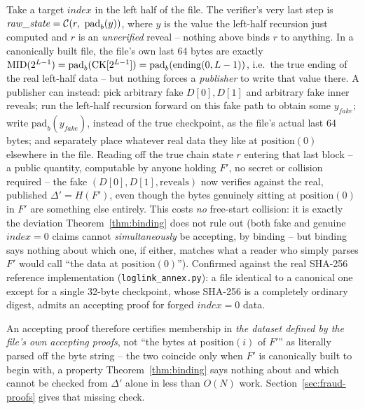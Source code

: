 \begin{remark}
\label{rem:layout-forgery}
Take a target $\mathit{index}$ in the left half of the file. The verifier's
very last step is $\mathit{raw\_state} = \C(r,\ \mathrm{pad}_b(y))$, where
$y$ is the value the left-half recursion just computed and $r$ is an
\emph{unverified} reveal -- nothing above binds $r$ to anything. In a
canonically built file, the file's own last 64 bytes are exactly
$\mathrm{MID}(2^{L-1}) = \mathrm{pad}_b(\mathrm{CK}[2^{L-1}]) = \mathrm{pad}_b(\mathrm{ending}(0,L-1))$,
i.e.\ the true ending of the real left-half data -- but nothing forces a
\emph{publisher} to write that value there. A publisher can instead:
pick arbitrary fake $D[0], D[1]$ and arbitrary fake inner reveals; run the
left-half recursion forward on this fake path to obtain some $y_{\mathit{fake}}$;
write $\mathrm{pad}_b(y_{\mathit{fake}})$, instead of the true checkpoint, as
the file's actual last 64 bytes; and separately place whatever real data
they like at $\mathrm{position}(0)$ elsewhere in the file. Reading off the
true chain state $r$ entering that last block -- a public quantity, computable
by anyone holding $F'$, no secret or collision required -- the fake
$(D[0], D[1], \text{reveals})$ now verifies against the real, published
$\Delta' = H(F')$, even though the bytes genuinely sitting at
$\mathrm{position}(0)$ in $F'$ are something else entirely. This costs
\emph{no} free-start collision: it is exactly the deviation
Theorem~\ref{thm:binding} does not rule out (both fake and genuine
$\mathit{index}=0$ claims cannot \emph{simultaneously} be accepting, by
binding -- but binding says nothing about which one, if either, matches
what a reader who simply parses $F'$ would call ``the data at
$\mathrm{position}(0)$''). Confirmed against the real SHA-256 reference
implementation (\texttt{loglink\_annex.py}): a file identical to a
canonical one except for a single 32-byte checkpoint, whose SHA-256 is a
completely ordinary digest, admits an accepting proof for forged
$\mathit{index}=0$ data.
\end{remark}

An accepting proof therefore certifies membership in \emph{the dataset
defined by the file's own accepting proofs}, not ``the bytes at
$\mathrm{position}(i)$ of $F'$'' as literally parsed off the byte string --
the two coincide only when $F'$ is canonically built to begin with, a
property Theorem~\ref{thm:binding} says nothing about and which cannot be
checked from $\Delta'$ alone in less than $O(N)$ work. Section~\ref{sec:fraud-proofs}
gives that missing check.

